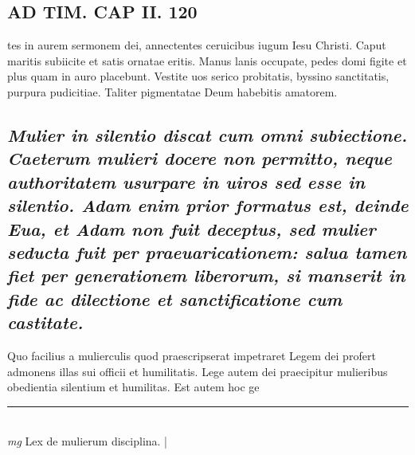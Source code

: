 \documentclass{article}
\begin{document}
\begin{pages}
\section*{AD TIM. CAP II. 120 }\pstart tes in aurem sermonem dei, annectentes ceruicibus iugum Iesu Christi. Caput maritis subiicite et satis ornatae eritis. Manus lanis occupate, pedes domi figite et plus quam in auro placebunt. Vestite uos serico probitatis, byssino sanctitatis, purpura pudicitiae. Taliter pigmentatae Deum habebitis amatorem.  \pend
{}
{}
\subsection*{\textit{Mulier in silentio discat cum omni subiectione. Caeterum mulieri docere non permitto, neque authoritatem usurpare in uiros sed esse in silentio. Adam enim prior formatus est, deinde Eua, et Adam non fuit deceptus, sed mulier seducta fuit per praeuaricationem: salua tamen fiet per generationem liberorum, si manserit in fide ac dilectione et sanctificatione cum castitate. }}\pstart Quo facilius a mulierculis quod praescripserat impetraret Legem dei profert admonens illas sui officii et humilitatis. Lege autem dei praecipitur mulieribus obedientia silentium et humilitas. Est autem hoc ge\pend
\vspace{0.5cm}\noindent
\vspace{0.2cm}\rule{1cm}{0.2pt}\\ 
\hspace{0.2cm}\textit{mg}
\footnotesize Lex de mulierum disciplina. 
\normalsize| 

\end{pages}
\end{document}
